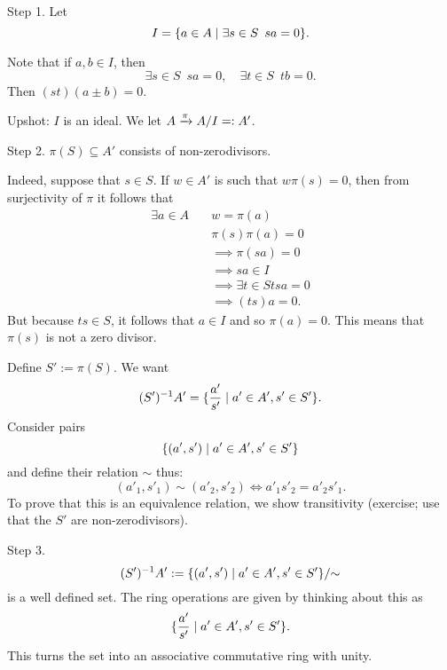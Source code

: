 \begin{construction}
  \mbox{}
  
  Step 1.
Let
\[I = \{ a \in A \mathrel{|} \exists s \in S \enspace sa = 0 \}.\]

Note that if $a, b \in I$, then
\[ \exists s \in S \enspace sa = 0, \quad \exists t \in S \enspace tb = 0.\]
Then $(st)(a \pm b) = 0$.

Upshot: $I$ is an ideal.
We let
$A \xrightarrow{\pi} A/I =: A'$.

Step 2.
$\pi(S) \subseteq A'$
consists of non-zerodivisors.

Indeed, suppose that $s \in S$. If $w \in A'$ is such that $w \pi(s) = 0$, then from surjectivity of $\pi$ it follows that
\begin{align*}
  \exists a \in A \quad & w = \pi(a) \\
                        & \pi(s) \pi(a) = 0 \\
                        & \implies \pi(sa) = 0 \\
                        & \implies  sa \in I \\
                        & \implies \exists t \in S tsa = 0 \\
                        & \implies (ts)a = 0.
\end{align*}
But because $ts \in S$, it follows that $a \in I$ and so $\pi(a) = 0$. This means that $\pi(s)$ is not a zero divisor.

Define $S' := \pi(S)$. We want
\[ (S')^{-1} A' = \{ \frac{a'}{s'} \mathrel{|} a' \in A', s' \in S' \}.\]
Consider pairs
\[\{(a', s') \mathrel{|} a' \in A', s' \in S'\}\]
and define their relation $\sim$ thus:
\[(a'_1, s'_1) \sim (a'_2, s'_2) \iff a'_1 s'_2 = a'_2 s'_1.\]
To prove that this is an equivalence relation, we show transitivity (exercise; use that the $S'$ are non-zerodivisors).

Step 3.
\[(S')^{-1}A' := \{(a', s') \mathrel{|} a' \in A', s' \in S' \} / {\sim}\]
is a well defined set.
The ring operations are given by thinking about this as
\[ \{ \frac{a'}{s'} \mathrel{|} a' \in A', s' \in S'\}.\]
This turns the set into an associative commutative ring with unity.
\end{construction}

